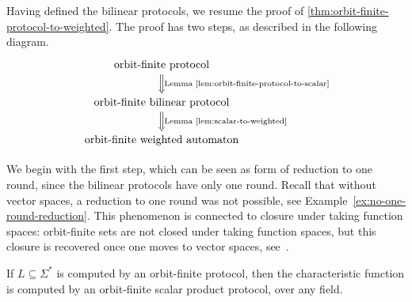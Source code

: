 Having defined the bilinear protocols, we resume the proof of \cref{thm:orbit-finite-protocol-to-weighted}. The proof has two steps, as described in the following diagram.
\[
\begin{tikzcd}
\text{orbit-finite protocol}
\ar[d,Rightarrow,"\text{Lemma~\ref{lem:orbit-finite-protocol-to-scalar}}"]
\\
\text{orbit-finite bilinear protocol}
\ar[d,Rightarrow, "\text{Lemma~\ref{lem:scalar-to-weighted}}"]
\\
\text{orbit-finite weighted automaton}
\end{tikzcd}
\]

We begin with the first step, which can be seen as form of reduction to one round, since the bilinear protocols have only one round. Recall that without vector spaces, a reduction to one round was not possible, see Example~\ref{ex:no-one-round-reduction}. This phenomenon is connected to closure under taking function spaces: orbit-finite sets are not closed under taking function spaces, but this closure is recovered once one moves to vector spaces, see~\cite[Section 8.3]{bojanczyk_slightly}. 

\begin{lemma}\label{lem:orbit-finite-protocol-to-scalar}
    If $L \subseteq \Sigma^*$ is computed by an orbit-finite protocol, then the characteristic function is computed by an orbit-finite scalar product protocol, over any field.
\end{lemma}



